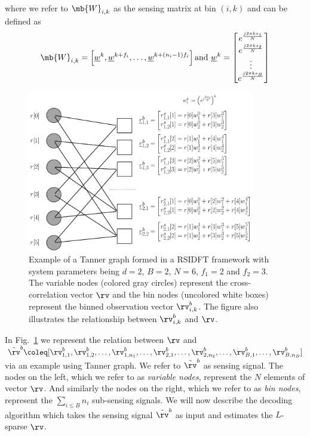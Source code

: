 \begin{enumerate}
where we refer to $\mb{W}_{i,k}$ as the sensing matrix at bin $(i,k)$ and can be defined as  
\begin{align}\label{Eqn:Sensing Matrix}
	\mb{W}_{i,k} = \left[\underline{w}^{k},\underline{w}^{k+f_i},\ldots, \underline{w}^{k+(n_i-1)f_i}\right] \text{and} ~\underline{w}^{k}=
	\begin{bmatrix}
		e^{\frac{j2\pi ks_1}{N}}\\
		e^{\frac{j2\pi ks_2}{N}}\\
		\vdots\\
		e^{\frac{j2\pi ks_B}{N}}
	\end{bmatrix}
\end{align}

\begin{figure}[h!]
	\begin{center}
		\includegraphics[height=7cm]{Figures/Factorgraph} 
	\end{center}	   
	\caption{Example of a Tanner graph formed in a RSIDFT framework with system parameters being $d=2$, $B=2$, $N=6$, $f_1 = 2$ and $f_2=3$. The variable nodes (colored gray circles) represent the cross-correlation vector $\rv$ and the bin nodes (uncolored white boxes) represent the binned observation vector $\rv_{i,k}^{b}$. The figure also illustrates the relationship between $\rv_{i,k}^{b}$ and $\rv$.}\label{fig:factorgraph}
	\vspace{5 pt}
\end{figure}

In Fig.~\ref{fig:factorgraph} we represent the relation between $\rv$ and $\tilde{\rv}^{b}\coleq[\rv^{b}_{1,1},\rv^{b}_{1,2},\ldots,\rv^{b}_{1,n_1},\ldots, \rv^{b}_{2,1},\ldots,\rv^{b}_{2,n_2},\ldots, \rv^{b}_{B,1},\ldots,\rv^{b}_{B,n_B}]$
via an example using Tanner graph. We refer to $\tilde{\rv}^{b}$ as sensing signal. The nodes on the left, which we refer to as {\it variable nodes}, represent the $N$ elements of vector $\rv$. And similarly the nodes on the right, which we refer to as {\it bin nodes}, represent the $\sum_{i\leq B} n_i$ sub-sensing signals. We will now describe the decoding algorithm which takes the sensing signal $\tilde{\rv}^b$ as input and estimates the $L$-sparse $\rv$.	 


\end{enumerate}
